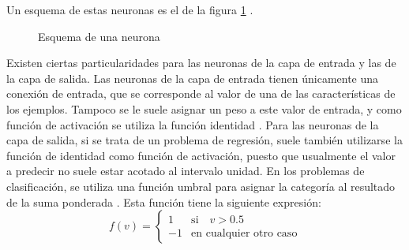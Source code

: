 Un esquema de estas neuronas es el de la figura \ref{fig:neurona} \cite{haykin_1999}.

\begin{figure}[htbp!]
    \centering
    \caption{Esquema de una neurona}
    \label{fig:neurona}
\end{figure}

\vspace{10pt}
Existen ciertas particularidades para las neuronas de la capa de entrada y las de la capa de salida. Las neuronas de la
capa de entrada tienen únicamente una conexión de entrada, que se corresponde al valor de una de las características de
los ejemplos. Tampoco se le suele asignar un peso a este valor de entrada, y como función de activación se utiliza la
función identidad \cite{Yagawa2021}. Para las neuronas de la capa de salida, si se trata de un problema de regresión,
suele también utilizarse la función de identidad como función de activación, puesto que usualmente el valor a predecir
no suele estar acotado al intervalo unidad. En los problemas de clasificación, se utiliza una función umbral para
asignar la categoría al resultado de la suma ponderada \cite{mlp}. Esta función tiene la siguiente expresión:
\begin{equation}
    f(v)=\begin{cases}
        1 & \text{si}\quad v>0.5 \\
        -1 & \text{en cualquier otro caso} 
    \end{cases}
\end{equation}


